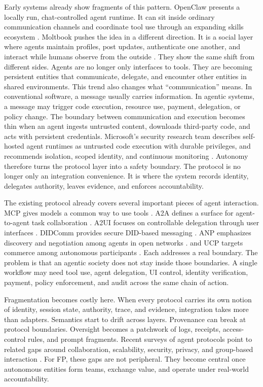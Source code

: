 \documentclass{llmxive}
\begin{document}
Early systems already show fragments of this pattern. OpenClaw presents a locally run, chat-controlled agent runtime. It can sit inside ordinary communication channels and coordinate tool use through an expanding skills ecosystem \cite{openclaw_site,openclaw_github}. Moltbook pushes the idea in a different direction. It is a social layer where agents maintain profiles, post updates, authenticate one another, and interact while humans observe from the outside \cite{moltbook_site,wired_moltbook}. They show the same shift from different sides. Agents are no longer only interfaces to tools. They are becoming persistent entities that communicate, delegate, and encounter other entities in shared environments.
This trend also changes what ``communication'' means. In conventional software, a message usually carries information. In agentic systems, a message may trigger code execution, resource use, payment, delegation, or policy change. The boundary between communication and execution becomes thin when an agent ingests untrusted content, downloads third-party code, and acts with persistent credentials. Microsoft's security research team describes self-hosted agent runtimes as untrusted code execution with durable privileges, and recommends isolation, scoped identity, and continuous monitoring \cite{microsoft_openclaw_security}. Autonomy therefore turns the protocol layer into a safety boundary. The protocol is no longer only an integration convenience. It is where the system records identity, delegates authority, leaves evidence, and enforces accountability.

The existing protocol already covers several important pieces of agent interaction. MCP gives models a common way to use tools \cite{mcp_spec}. A2A defines a surface for agent-to-agent task collaboration \cite{a2a_spec}. A2UI focuses on controllable delegation through user interfaces \cite{a2ui_spec}. DIDComm provides secure DID-based messaging \cite{didcomm_spec}. ANP emphasizes discovery and negotiation among agents in open networks \cite{anp_paper}. and UCP targets commerce among autonomous participants \cite{ucp_spec}. Each addresses a real boundary. The problem is that an agentic society does not stay inside those boundaries. A single workflow may need tool use, agent delegation, UI control, identity verification, payment, policy enforcement, and audit across the same chain of action.

Fragmentation becomes costly here. When every protocol carries its own notion of identity, session state, authority, trace, and evidence, integration takes more than adapters. Semantics start to drift across layers. Provenance can break at protocol boundaries. Oversight becomes a patchwork of logs, receipts, access-control rules, and prompt fragments. Recent surveys of agent protocols point to related gaps around collaboration, scalability, security, privacy, and group-based interaction \cite{yang2025survey}. For FP, these gaps are not peripheral. They become central once autonomous entities form teams, exchange value, and operate under real-world accountability.
\end{document}
